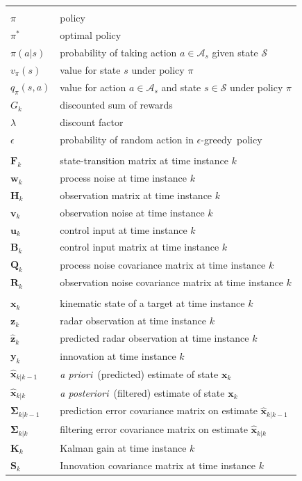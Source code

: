 \documentclass[english, 12pt, a4paper, elec, utf8, a-1b, online]{aaltothesis}
\renewcommand{\vec}[1]{\mathbf{#1}}
\newcommand{\Ss}{\mathcal{S}}
\newcommand{\As}{\mathcal{A}}
\newcommand{\egreedy}{$\epsilon$-greedy~}
\newcommand{\xprior}{\hat{\vec{x}}_{k|k-1}}
\newcommand{\xpost}{\hat{\vec{x}}_{k|k}}
\newcommand{\priorecov}{\boldsymbol{\Sigma}_{k|k-1}}
\newcommand{\postecov}{\boldsymbol{\Sigma}_{k|k}}
\newcommand{\prefitinnov}{\vec{y}_k}
\newcommand{\x}{\vec{x}_k}
\newcommand{\z}{\vec{z}_k}
\newcommand{\stmodel}{\vec{F}_k}
\newcommand{\cimodel}{\vec{B}_k}
\newcommand{\cinput}{\vec{u}_k}
\newcommand{\pnoise}{\vec{w}_k}
\newcommand{\omodel}{\vec{H}_k}
\newcommand{\onoise}{\vec{v}_k}
\newcommand{\ocov}{\vec{R}_k}
\newcommand{\pcov}{\vec{Q}_k}
\newcommand{\innocov}{\vec{S}_k}
\newcommand{\gain}{\vec{K}_k}
\def\prior{\textit{a priori}\ }
\def\post{\textit{a posteriori}\ }
\newcommand{\zhat}{\hat{\vec{z}}_k}
\begin{document}
\begin{longtable}{ll}
&\\
$\pi$ & policy \\
$\pi^*$ & optimal policy \\
$\pi(a|s)$ & probability of taking action $a \in \As_s$ given state $\Ss$ \\
$v_\pi(s)$ & value for state $s$ under policy $\pi$ \\
$q_\pi(s, a)$ & value for action $a \in \As_s$ and state $s \in \Ss$ under policy $\pi$ \\
$G_k$ & discounted sum of rewards \\
$\lambda$ & discount factor \\
$\epsilon$ & probability of random action in \egreedy policy \\
&\\
$\stmodel$ & state-transition matrix at time instance $k$\\
$\pnoise$ & process noise at time instance $k$\\
$\omodel$ & observation matrix at time instance $k$\\
$\onoise$ & observation noise at time instance $k$\\
$\cinput$ & control input at time instance $k$\\
$\cimodel$ & control input matrix at time instance $k$\\
$\pcov$ & process noise covariance matrix at time instance $k$\\
$\ocov$ & observation noise covariance matrix at time instance $k$\\
&\\
$\x$ & kinematic state of a target at time instance $k$ \\
$\z$ & radar observation at time instance $k$ \\
$\zhat$ & predicted radar observation at time instance $k$ \\
$\prefitinnov$ & innovation at time instance $k$ \\
$\xprior$ & \prior (predicted) estimate of state $\x$\\
$\xpost$ & \post (filtered) estimate of state $\x$ \\
$\priorecov$ & prediction error covariance matrix on estimate $\xprior$ \\
$\postecov$ & filtering error covariance matrix on estimate $\xpost$ \\
$\gain$ & Kalman gain at time instance $k$ \\
$\innocov$ & Innovation covariance matrix at time instance $k$ \\

\end{longtable}
\end{document}
